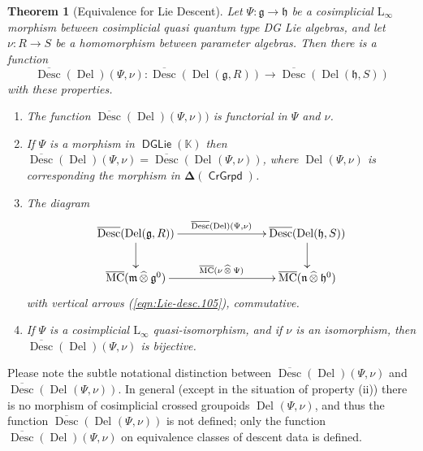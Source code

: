 \documentclass[a4paper, 10pt]{amsart}
\newtheorem{thm}[equation]{Theorem}
\theoremstyle{definition}
\numberwithin{equation}{section}
\newcommand{\opn}{\operatorname}
\newcommand{\cat}[1]{\operatorname{\mathsf{#1}}}
\newcommand{\ol}{\overline}
\newcommand{\rmitem}[1]{\item[\text{\textup{(#1)}}]}
\newcommand{\mfrak}[1]{\mathfrak{#1}}
\newcommand{\mrm}[1]{\mathrm{#1}}
\newcommand{\mbb}[1]{\mathbb{#1}}
\newcommand{\tup}[1]{\textup{#1}}
\newcommand{\bsym}[1]{\boldsymbol{#1}}
\newcommand{\hatotimes}[1]{\, \what{{\otimes}}_{#1} \,}
\newcommand{\hot}{\hatotimes{}}
\newcommand{\what}[1]{\widehat{#1}}
\newcommand{\K}{\mbb{K}}
\newcommand{\g}{\mfrak{g}}
\newcommand{\m}{\mfrak{m}}
\newcommand{\h}{\mfrak{h}}
\newcommand{\n}{\mfrak{n}}
\newcommand{\lb}{\linebreak}
\begin{document}
\begin{thm}[Equivalence for Lie Descent]  \label{thm:Lie-desc.101}
Let $\Psi : \g \to \h$ be a cosimplicial $\mrm{L}_{\infty}$ morphism between 
cosimplicial quasi quantum type DG Lie algebras, and let 
$\nu : R \to S$ be a homomorphism between parameter algebras. Then there
is a function 
\[ \ol{\opn{Desc}}(\opn{Del})(\Psi, \nu) : 
\ol{\opn{Desc}}(\opn{Del}(\g, R)) \to \ol{\opn{Desc}}(\opn{Del}(\h, S))  \]
with these properties. 

\begin{enumerate}
\rmitem{i} The function $\ol{\opn{Desc}}(\opn{Del})(\Psi, \nu))$
is functorial in $\Psi$ and $\nu$.

\rmitem{ii}  If $\Psi$ is a morphism in $\cat{DGLie}(\K)$ then 
$\ol{\opn{Desc}}(\opn{Del})(\Psi, \nu) = 
\ol{\opn{Desc}}(\opn{Del}^{}(\Psi, \nu))$,
where  
$\opn{Del}^{}(\Psi, \nu)$ is corresponding the morphism in
$\bsym{\Delta}(\cat{CrGrpd})$.

\rmitem{iii} The diagram 
\[ \UseTips \xymatrix @C=18ex @R=5ex {
\ol{\opn{Desc}}(\opn{Del}(\g, R))
\ar[d]
\ar[r]^(0.5){\ol{\opn{Desc}}(\opn{Del})(\Psi, \nu)}
&
\ol{\opn{Desc}}(\opn{Del}(\h, S))
\ar[d]
\\
\ol{\opn{MC}}(\m \hot \g^0)
\ar[r]^(0.5){\ol{\opn{MC}}(\nu \hot \Psi)}
&
\ol{\opn{MC}}(\n \hot \h^0)
} \]
with vertical arrows \tup{(\ref{eqn:Lie-desc.105})}, commutative. 

\rmitem{iv} If $\Psi$ is a cosimplicial $\mrm{L}_{\infty}$ quasi-isomorphism, 
and if $\nu$ is an isomorphism, then 
$\ol{\opn{Desc}}(\opn{Del})(\Psi, \nu)$ is bijective.  
\end{enumerate}
\end{thm}

Please note the subtle notational distinction between 
$\ol{\opn{Desc}}(\opn{Del})(\Psi, \nu)$ and \lb
$\ol{\opn{Desc}}(\opn{Del}^{}(\Psi, \nu))$.
In general (except in the situation of property (ii)) there is no morphism of
cosimplicial crossed groupoids $\opn{Del}^{}(\Psi, \nu)$, and thus the function 
$\ol{\opn{Desc}}(\opn{Del}^{}(\Psi, \nu))$ is not defined; only the function 
$\ol{\opn{Desc}}(\opn{Del})(\Psi, \nu)$ on equivalence classes of descent data
is defined. 
\end{document}
